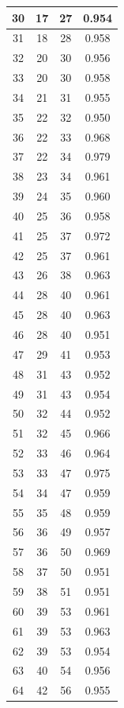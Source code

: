 \begin{table}
\begin{tabular}{|c|c|c|c|}
 30  & 17  & 27 & 0.954  \\ \hline
 31  & 18  & 28 & 0.958  \\ \hline
 32  & 20  & 30 & 0.956  \\ \hline
 33  & 20  & 30 & 0.958  \\ \hline
 34  & 21  & 31 & 0.955  \\ \hline
 35  & 22  & 32 & 0.950  \\ \hline
 36  & 22  & 33 & 0.968  \\ \hline
 37  & 22  & 34 & 0.979  \\ \hline
 38  & 23  & 34 & 0.961  \\ \hline
 39  & 24  & 35 & 0.960  \\ \hline
 40  & 25  & 36 & 0.958  \\ \hline
 41  & 25  & 37 & 0.972  \\ \hline
 42  & 25  & 37 & 0.961  \\ \hline
 43  & 26  & 38 & 0.963  \\ \hline
 44  & 28  & 40 & 0.961  \\ \hline
 45  & 28  & 40 & 0.963  \\ \hline
 46  & 28  & 40 & 0.951  \\ \hline
 47  & 29  & 41 & 0.953  \\ \hline
 48  & 31  & 43 & 0.952  \\ \hline
 49  & 31  & 43 & 0.954  \\ \hline
 50  & 32  & 44 & 0.952  \\ \hline
 51  & 32  & 45 & 0.966  \\ \hline
 52  & 33  & 46 & 0.964  \\ \hline
 53  & 33  & 47 & 0.975  \\ \hline
 54  & 34  & 47 & 0.959  \\ \hline
 55  & 35  & 48 & 0.959  \\ \hline
 56  & 36  & 49 & 0.957  \\ \hline
 57  & 36  & 50 & 0.969  \\ \hline
 58  & 37  & 50 & 0.951  \\ \hline
 59  & 38  & 51 & 0.951  \\ \hline
 60  & 39  & 53 & 0.961  \\ \hline
 61  & 39  & 53 & 0.963  \\ \hline
 62  & 39  & 53 & 0.954  \\ \hline
 63  & 40  & 54 & 0.956  \\ \hline
 64  & 42  & 56 & 0.955  \\ \hline

\end{tabular}
\end{table}
